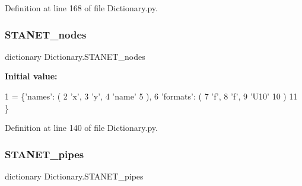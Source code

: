 Definition at line 168 of file Dictionary.\+py.

\mbox{\label{namespace_dictionary_a716974bfb5b5b6f527f42b336c7d8a78}} 
\subsubsection{\texorpdfstring{S\+T\+A\+N\+E\+T\+\_\+nodes}{STANET\_nodes}}
{\footnotesize\ttfamily dictionary Dictionary.\+S\+T\+A\+N\+E\+T\+\_\+nodes}

{\bfseries Initial value\+:}
\begin{DoxyCode}
1 =           \{\textcolor{stringliteral}{'names'}: (
2                                 \textcolor{stringliteral}{'x'},
3                                 \textcolor{stringliteral}{'y'},
4                                 \textcolor{stringliteral}{'name'}
5                                 ),
6                        \textcolor{stringliteral}{'formats'}: (
7                                 \textcolor{stringliteral}{'f'},
8                                 \textcolor{stringliteral}{'f'},
9                                 \textcolor{stringliteral}{'U10'}
10                                 )
11                                \}
\end{DoxyCode}


Definition at line 140 of file Dictionary.\+py.

\mbox{\label{namespace_dictionary_a57c00cf376cd84145639bfb65b4e155c}} 
\subsubsection{\texorpdfstring{S\+T\+A\+N\+E\+T\+\_\+pipes}{STANET\_pipes}}
{\footnotesize\ttfamily dictionary Dictionary.\+S\+T\+A\+N\+E\+T\+\_\+pipes}

